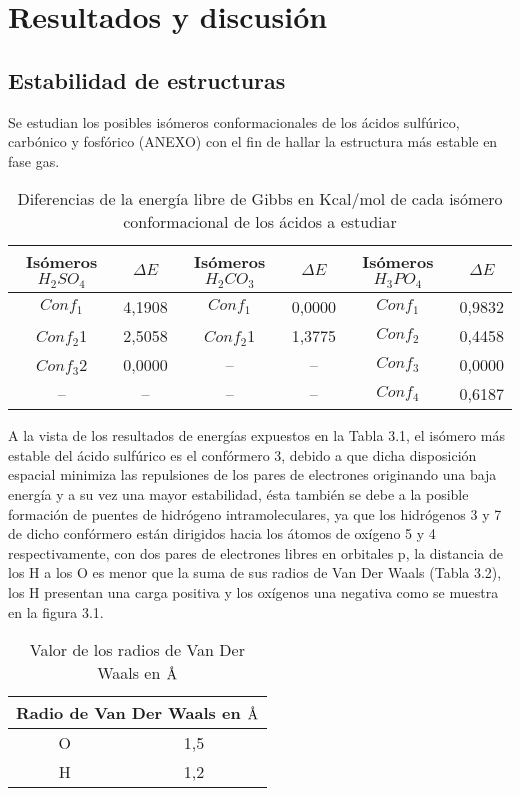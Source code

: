 \chapter{Resultados y discusión}

\section{Estabilidad de estructuras}

Se estudian los posibles isómeros conformacionales de los ácidos sulfúrico, carbónico y fosfórico (ANEXO) con el fin de hallar la estructura más estable en fase gas. \\

  \begin{table}[H]
\begin{center}
\begin{tabular}{|c|c|c|c|c|c|}
\hline
Isómeros $H_2SO_4$ & $\Delta E$ & Isómeros $H_2CO_3$ & $\Delta E$ & Isómeros $H_3PO_4$ & $\Delta E$ \\ \hline
$Conf_1$ & 4,1908 & $Conf_1$ & 0,0000 & $Conf_1$ & 0,9832 \\ \hline
$Conf_2$1 & 2,5058 & $Conf_2$1 & 1,3775 & $Conf_2$ & 0,4458 \\ \hline
$Conf_3$2 & 0,0000 & -- & -- & $Conf_3$ & 0,0000 \\ \hline
-- & -- & -- & -- & $Conf_4$ & 0,6187 \\ \hline
\end{tabular}
\caption{Diferencias de la energía libre de Gibbs en Kcal/mol de cada isómero conformacional de los ácidos a estudiar}
\label{tab:3.1}
\end{center}
\end{table}
A la vista de los resultados de energías expuestos en la Tabla 3.1, el isómero más estable del ácido sulfúrico es el confórmero 3, debido a que dicha disposición espacial minimiza las repulsiones de los pares de electrones originando una baja energía y a su vez una mayor estabilidad, ésta también se debe a la posible formación de puentes de hidrógeno intramoleculares, ya que los hidrógenos 3 y 7 de dicho confórmero están dirigidos hacia los átomos de oxígeno 5 y 4 respectivamente, con dos pares de electrones libres en orbitales p, la distancia de los H a los O es menor que la suma de sus radios de Van Der Waals (Tabla 3.2), los H presentan una carga positiva y los oxígenos una negativa como se muestra en la figura 3.1.
	\begin{table}[H]
\begin{center}
\begin{tabular}{|c|c|}
	\hline
	\multicolumn{2}{|c|}{Radio de Van Der Waals en $\mbox{\normalfont\AA}$} \\ \hline
	O & 1,5 \\ \hline
	H & 1,2 \\ \hline
\end{tabular}
\caption{Valor de los radios de Van Der Waals en $\mbox{\normalfont\AA}$}
\end{center}	
\end{table}
